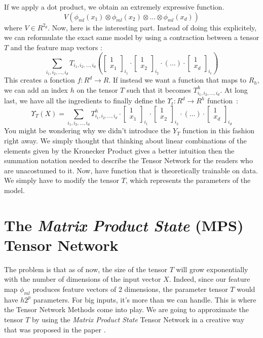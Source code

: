 \documentclass{article}
\theoremstyle{definition}
\theoremstyle{definition}
\begin{document}
If we apply a dot product, we obtain an extremely expressive function.
\[
    V 
    \left(\phi_{ml}(x_1) \otimes \phi_{ml}(x_2)\otimes \dots \otimes \phi_{ml}(x_d) \right)
\]
where $V \in R^{2_d}$.
Now, here is the interesting part. Instead of doing this explicitely, we can reformulate the exact same model by using a contraction between a tensor $T$ and the feature map vectors : 
\[
    \sum_{i_1, i_2, \dots, i_d} T_{i_1, i_2, \dots, i_d}
    \left(
    \begin{bmatrix}
        1 \\ x_1
    \end{bmatrix}_{i_1}
    \cdot
    \begin{bmatrix}
        1 \\ x_2
    \end{bmatrix}_{i_2}
    \cdot
    (\dots)
    \cdot
    \begin{bmatrix}
        1 \\ x_d
    \end{bmatrix}_{i_e}
    \right)
\]
This creates a fonction $f: R^d \to R$. If instead we want a function that maps to $R_h$, we can add an index $h$ on the tensor $T$ such that it becomes $T^{h}_{i_1, i_2, \dots, i_d}$. At long last, we have all the ingredients to finally define the $\Upsilon_t :  R^d \to R^h$ function~:
\[
    \Upsilon_T(X) =     \sum_{i_1, i_2, \dots, i_d} T^{h}_{i_1, i_2, \dots, i_d}
    \cdot
    \begin{bmatrix}
        1 \\ x_1
    \end{bmatrix}_{i_1}
    \cdot
    \begin{bmatrix}
        1 \\ x_2
    \end{bmatrix}_{i_2}
    \cdot
    (\dots)
    \cdot
    \begin{bmatrix}
        1 \\ x_d
    \end{bmatrix}_{i_d}
\]
You might be wondering why we didn't introduce the $Y_T$ function in this fashion right away. We simply thought that thinking about linear combinations of the elements given by the Kronecker Product gives a better intuition then the summation notation needed to describe the Tensor Network for the readers who are unacostumed to it. Now, have function that is theoretically trainable on data. We simply have to modify the tensor $T$, which represents the parameters of the model.

\section{The \emph{Matrix Product State} (MPS) Tensor Network}
The problem is that as of now, the size of the tensor $T$ will grow exponentially with the number of dimensions of the input vector $X$. Indeed, since our feature map $\phi_{ml}$ produces feature vectors of $2$ dimensions, the parameter tensor $T$ would have $h2^p$ parameters. For big inputs, it's more than we can handle. This is where the Tensor Network Methods come into play. We are going to approximate the tensor $T$ by using the \emph{Matrix Product State} Tensor Network in a creative way that was proposed in the paper \cite{stoudenmire2017supervised}.
\end{document}
